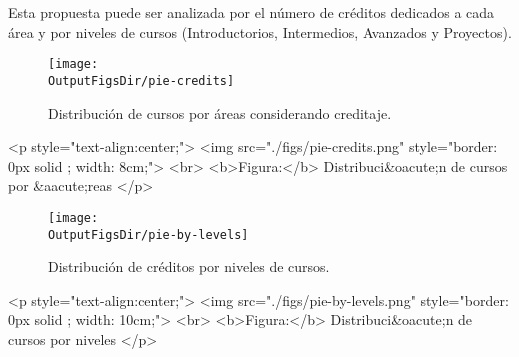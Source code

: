 Esta propuesta puede ser analizada por el número de créditos dedicados a cada área
y por niveles de cursos (Introductorios, Intermedios, Avanzados y Proyectos).
\vspace{0.5cm}
 
\begin{latexonly}
      \begin{figure}[H]
            \centering
            \texttt{[image: \\OutputFigsDir/pie-credits]}
            \label{fig:pie-credits}
            \caption{Distribución de cursos por áreas considerando creditaje.}
      \end{figure}
\end{latexonly}

\begin{htmlonly}
      \begin{rawhtml}
            <p style="text-align:center;">
            <img src="./figs/pie-credits.png" style="border: 0px solid ; width: 8cm;"> <br>
            <b>Figura:</b> Distribuci&oacute;n de cursos por &aacute;reas
            </p>
      \end{rawhtml}
\end{htmlonly}

% 


\begin{latexonly}
      \begin{figure}[H]
            \centering
            \texttt{[image: \\OutputFigsDir/pie-by-levels]}
            \label{fig:pie-niveles}
            \caption{Distribución de créditos por niveles de cursos.}
      \end{figure}
\end{latexonly}
\begin{htmlonly}
      \begin{rawhtml}
            <p style="text-align:center;">
            <img src="./figs/pie-by-levels.png" style="border: 0px solid ; width: 10cm;"> <br>
            <b>Figura:</b> Distribuci&oacute;n de cursos por niveles
            </p>
      \end{rawhtml}
\end{htmlonly}